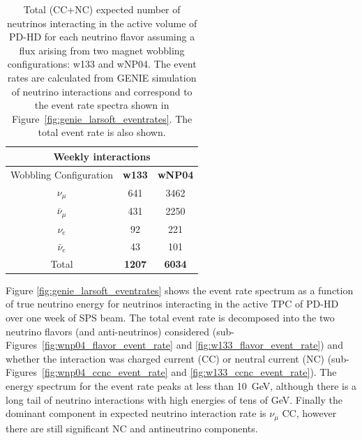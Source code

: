 \begin{table}[]
    \centering
    \begin{tabular}{|c|c|c|}
        \hline
        \multicolumn{3}{|c|}{\textbf{Weekly interactions}} \\
        \hline
        Wobbling Configuration & \textbf{w133} & \textbf{wNP04} \\
        \hline
        $\nu_\mu$ & 641 & 3462 \\
        $\bar{\nu}_\mu$ & 431 & 2250 \\
        $\nu_e$ & 92 & 221 \\
        $\bar{\nu}_e$  & 43 & 101 \\
        \hline
        Total & \textbf{1207} & \textbf{6034} \\
        \hline
    \end{tabular}
    \caption{Total (CC+NC) expected number of neutrinos interacting in the active volume of PD-HD for each neutrino flavor assuming a flux arising from two magnet wobbling configurations: w133 and wNP04. The event rates are calculated from GENIE simulation of neutrino interactions and correspond to the event rate spectra shown in Figure~\ref{fig:genie_larsoft_eventrates}. The total event rate is also shown.}
    \label{tab:number_events}
\end{table}

Figure \ref{fig:genie_larsoft_eventrates} shows the event rate spectrum as a function of true neutrino energy for neutrinos interacting in the active TPC of PD-HD over one week of SPS beam. The total event rate is decomposed into the two neutrino flavors (and anti-neutrinos) considered (sub-Figures~\ref{fig:wnp04_flavor_event_rate} and \ref{fig:w133_flavor_event_rate}) and whether the interaction was charged current  (CC) or neutral current (NC) (sub-Figures~\ref{fig:wnp04_ccnc_event_rate} and \ref{fig:w133_ccnc_event_rate}). The energy spectrum for the event rate peaks at less than 10~GeV, although there is a long tail of neutrino interactions with high energies of tens of GeV. Finally the dominant component in expected neutrino interaction rate is $\nu_{\mu}$ CC, however there are still significant NC and antineutrino components.

